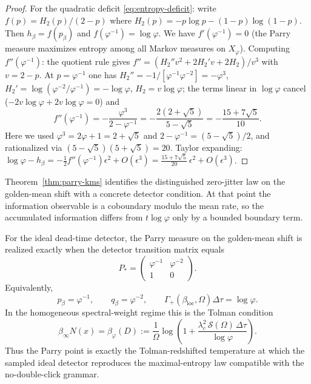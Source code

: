 \begin{proof}
For the quadratic deficit \eqref{eq:entropy-deficit}: write $f(p)=H_2(p)/(2-p)$ where $H_2(p)=-p\log p-(1-p)\log(1-p)$. Then $h_\beta=f(p_\beta)$ and $f(\varphi^{-1})=\log\varphi$. We have $f'(\varphi^{-1})=0$ (the Parry measure maximizes entropy among all Markov measures on $X_\varphi$). Computing $f''(\varphi^{-1})$: the quotient rule gives $f''=(H_2''v^2+2H_2'v+2H_2)/v^3$ with $v=2-p$. At $p=\varphi^{-1}$ one has $H_2''=-1/[\varphi^{-1}\varphi^{-2}]=-\varphi^3$, $H_2'=\log(\varphi^{-2}/\varphi^{-1})=-\log\varphi$, $H_2=v\log\varphi$; the terms linear in $\log\varphi$ cancel ($-2v\log\varphi+2v\log\varphi=0$) and
\[
f''(\varphi^{-1})
=
-\frac{\varphi^3}{2-\varphi^{-1}}
=
-\frac{2(2+\sqrt 5)}{5-\sqrt 5}
=
-\frac{15+7\sqrt 5}{10}.
\]
Here we used $\varphi^3=2\varphi+1=2+\sqrt 5$ and $2-\varphi^{-1}=(5-\sqrt 5)/2$, and rationalized via $(5-\sqrt 5)(5+\sqrt 5)=20$. Taylor expanding: $\log\varphi-h_\beta=-\frac12 f''(\varphi^{-1})\epsilon^2+O(\epsilon^3)=\frac{15+7\sqrt 5}{20}\,\epsilon^2+O(\epsilon^3)$.
\end{proof}

\begin{remark}\label{rem:parry-kms-significance}
Theorem~\ref{thm:parry-kms} identifies the distinguished zero-jitter law on the golden-mean shift with a concrete detector condition. At that point the information observable is a coboundary modulo the mean rate, so the accumulated information differs from $t\log\varphi$ only by a bounded boundary term.
\end{remark}

\begin{corollary}\label{cor:parry-parameter-values}
For the ideal dead-time detector, the Parry measure on the golden-mean shift is realized exactly when the detector transition matrix equals
\[
P_*=
\begin{pmatrix}
\varphi^{-1}&\varphi^{-2}\\
1&0
\end{pmatrix}.
\]
Equivalently,
\begin{equation}\label{eq:parry-parameter-values}
p_\beta=\varphi^{-1},
\qquad
q_\beta=\varphi^{-2},
\qquad
\Gamma_+(\beta_{\mathrm{loc}},\Omega)\Delta\tau=\log\varphi.
\end{equation}
In the homogeneous spectral-weight regime this is the Tolman condition
\begin{equation}\label{eq:parry-tolman-matching}
\beta_\infty N(x)=\beta_\varphi(D)
:=
\frac{1}{\Omega}
\log\!\left(
1+\frac{\lambda_c^2\,\mathcal S(\Omega)\,\Delta\tau}{\log\varphi}
\right).
\end{equation}
Thus the Parry point is exactly the Tolman-redshifted temperature at which the sampled ideal detector reproduces the maximal-entropy law compatible with the no-double-click grammar.
\end{corollary}

